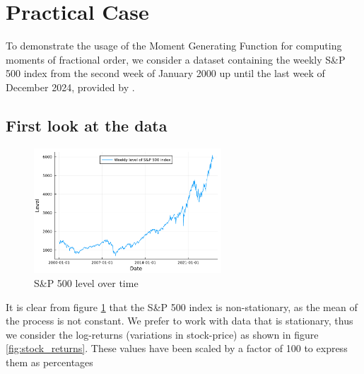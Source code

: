 \section{Practical Case}\label{s:practical_case}
To demonstrate the usage of the Moment Generating Function for computing moments of fractional order, we consider a dataset containing the weekly S\&P 500 index from the second week of January 2000 up until the last week of December 2024, provided by \citet{wrds2025}.
\subsection{First look at the data}

\begin{figure}[H]
    \centering
    \includegraphics[width=0.625\textwidth]{figures/stock_level.pdf}
    \caption{S\&P 500 level over time}
    \label{fig:stock_level}
\end{figure}
It is clear from figure \ref{fig:stock_level} that the S\&P 500 index is non-stationary, as the mean of the process is not constant. We prefer to work with data that is stationary, thus we consider the log-returns (variations in stock-price) as shown in figure \ref{fig:stock_returns}. These values have been scaled by a factor of 100 to express them as percentages

